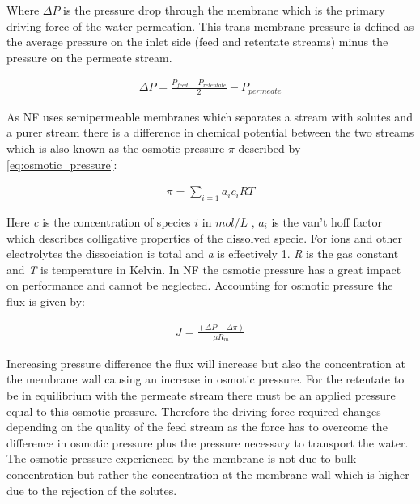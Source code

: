 Where $\Delta P $ is the pressure drop through the membrane which is the primary driving force of the water permeation. %
This trans-membrane pressure is defined as the average pressure on the inlet side (feed and retentate streams) minus the pressure on the permeate stream. 
\begin{ceqn}
    \begin{align}
        \Delta P=\frac{P_{feed}+P_{retentate}}{2}-P_{permeate}
    \end{align}
\end{ceqn}



As NF uses semipermeable membranes which separates a stream with solutes and a purer stream there is a difference in chemical potential between the two streams which is also known as the osmotic pressure $\pi$ described by \cref{eq:osmotic_pressure}:
\begin{ceqn}
    \begin{align}
    \label{eq:osmotic_pressure}
       \pi = \sum_{i=1} a_ic_iRT 
    \end{align}
\end{ceqn}
Here \textit{c} is the concentration of species $i$ in $mol/L$ , $a_i$ is the van't hoff factor which describes colligative properties of the dissolved specie. 
For ions and other electrolytes the dissociation is total and \textit{a} is effectively 1.
\textit{R} is the gas constant and \textit{T} is temperature in Kelvin. 
In NF the osmotic pressure has a great impact on performance and cannot be neglected.
Accounting for osmotic pressure the flux is given by:
\begin{ceqn}
    \begin{align} 
        J=\frac{(\Delta P-\Delta \pi)}{\mu R_m}
        \label{eqn:flux_including_osmotic_pressure}
    \end{align}
\end{ceqn}

Increasing pressure difference the flux will increase but also the concentration at the membrane wall causing an increase in osmotic pressure. 
For the retentate to be in equilibrium with the permeate stream there must be an applied pressure equal to this osmotic pressure.
Therefore the driving force required changes depending on the quality of the feed stream as the force has to overcome the difference in osmotic pressure plus the pressure necessary to transport the water.
The osmotic pressure experienced by the membrane is not due to bulk concentration but rather the concentration at the membrane wall which is higher due to the rejection of the solutes.
 



